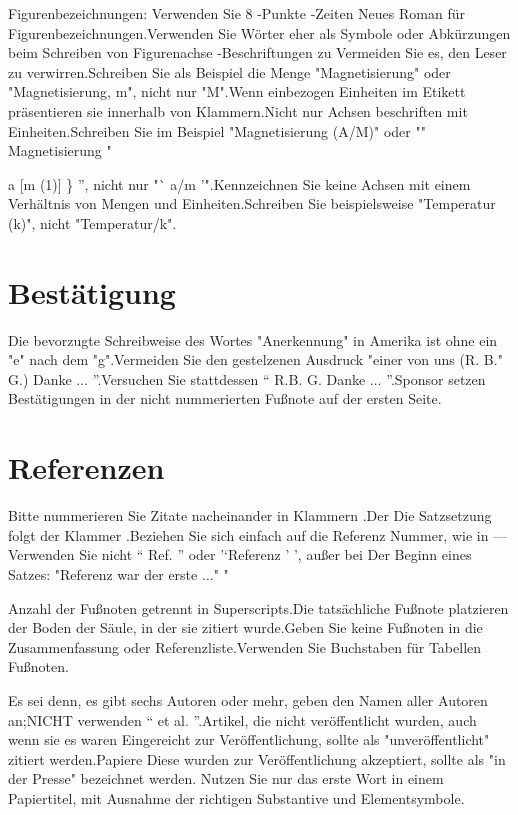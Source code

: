 \documentclass[conference]{IEEEtran}
\begin{document}
Figurenbezeichnungen: Verwenden Sie 8 -Punkte -Zeiten Neues Roman für Figurenbezeichnungen.Verwenden Sie Wörter
eher als Symbole oder Abkürzungen beim Schreiben von Figurenachse -Beschriftungen zu
Vermeiden Sie es, den Leser zu verwirren.Schreiben Sie als Beispiel die Menge
"Magnetisierung" oder "Magnetisierung, m", nicht nur "M".Wenn einbezogen
Einheiten im Etikett präsentieren sie innerhalb von Klammern.Nicht nur Achsen beschriften
mit Einheiten.Schreiben Sie im Beispiel "Magnetisierung (A/M)" oder "" Magnetisierung "
\ {a [m (1)] \} '', nicht nur "` a/m '".Kennzeichnen Sie keine Achsen mit einem Verhältnis von
Mengen und Einheiten.Schreiben Sie beispielsweise "Temperatur (k)", nicht
"Temperatur/k".

\section*{Bestätigung}

Die bevorzugte Schreibweise des Wortes "Anerkennung" in Amerika ist ohne
ein "e" nach dem "g".Vermeiden Sie den gestelzenen Ausdruck "einer von uns (R. B."
G.) Danke $\ldots$ ''.Versuchen Sie stattdessen `` R.B. G. Danke $\ldots$ ''.Sponsor setzen
Bestätigungen in der nicht nummerierten Fußnote auf der ersten Seite.

\section*{Referenzen}

Bitte nummerieren Sie Zitate nacheinander in Klammern \cite{b1}.Der
Die Satzsetzung folgt der Klammer \cite{b2}.Beziehen Sie sich einfach auf die Referenz
Nummer, wie in \cite{b3} --- Verwenden Sie nicht `` Ref.\cite{b3} '' oder '`Referenz \cite{b3}' ', außer bei
Der Beginn eines Satzes: "Referenz \cite{b3} war der erste $\ldots$" "

Anzahl der Fußnoten getrennt in Superscripts.Die tatsächliche Fußnote platzieren
der Boden der Säule, in der sie zitiert wurde.Geben Sie keine Fußnoten in die
Zusammenfassung oder Referenzliste.Verwenden Sie Buchstaben für Tabellen Fußnoten.

Es sei denn, es gibt sechs Autoren oder mehr, geben den Namen aller Autoren an;NICHT verwenden
`` et al. ''.Artikel, die nicht veröffentlicht wurden, auch wenn sie es waren
Eingereicht zur Veröffentlichung, sollte als "unveröffentlicht" \cite{b4} zitiert werden.Papiere
Diese wurden zur Veröffentlichung akzeptiert, sollte als "in der Presse" \cite{b5} bezeichnet werden.
Nutzen Sie nur das erste Wort in einem Papiertitel, mit Ausnahme der richtigen Substantive und
Elementsymbole.

}
\end{document}
